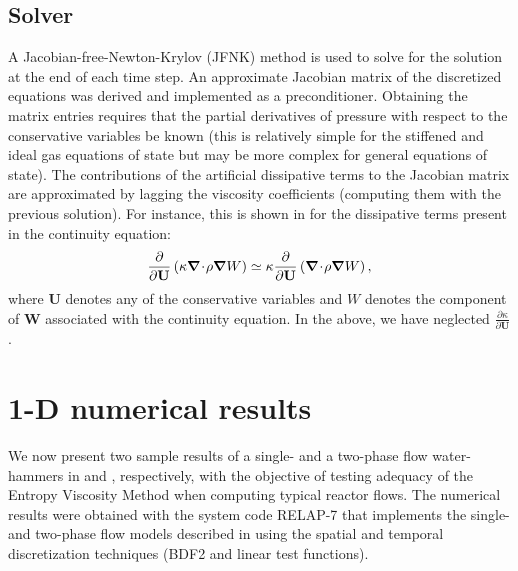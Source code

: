 \documentclass{mc2015}
\begin{document}
\subsection{Solver} \label{sec:solver}
%
A Jacobian-free-Newton-Krylov (JFNK) method is used to solve for the solution at the end of each time step. 
An approximate Jacobian matrix of the discretized equations was derived and implemented as a preconditioner. Obtaining the 
matrix entries requires that the partial derivatives of pressure with respect to the conservative variables 
be known (this is relatively simple for the stiffened and ideal gas equations of state but may be more 
complex for general equations of state). The contributions of the artificial dissipative terms to the 
Jacobian matrix are approximated by lagging the viscosity coefficients (computing them with the previous solution). 
For instance, this is shown in  for the dissipative terms present in the continuity equation:
\begin{equation}
\label{eq:jac_diss_term}
\frac{\partial}{\partial \mathbf U} \left( \kappa \boldsymbol\nabla\! \cdot \! \rho \boldsymbol\nabla W \right) \simeq \kappa \frac{\partial}{\partial \mathbf U} \left( \boldsymbol\nabla\! \cdot \! \rho \boldsymbol\nabla W \right),
\end{equation}  
where $\mathbf  U$ denotes any of the conservative variables and $W$ denotes the component of $\mathbf  W$ associated with the 
continuity equation. In the above, we have neglected $\frac{\partial \kappa}{\partial \mathbf U}$.
%
\section{1-D numerical results}\label{sec:results}
%
We now present two sample results of a single- and a two-phase flow water-hammers in  and , respectively, with the objective of testing adequacy of the Entropy Viscosity Method when computing typical reactor flows. The numerical results were obtained with the system code RELAP-7 that implements the single- and two-phase flow models described in  using the spatial and temporal discretization techniques  (BDF2 and linear test functions).
\end{document}
